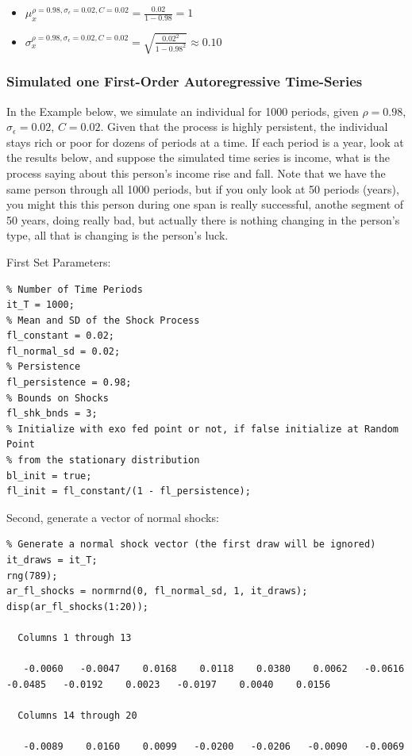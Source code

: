 \documentclass[
]{book}
\begin{document}
\begin{itemize}
\item
  \(\displaystyle \mu_x^{\rho =0.98,\sigma_{\epsilon } =0.02,C=0.02} =\frac{0.02}{1-0.98}=1\)
\item
  \(\displaystyle \sigma_x^{\rho =0.98,\sigma_{\epsilon } =0.02,C=0.02} =\sqrt{\frac{0.02^2 }{1-0.98^2 }}\approx 0.10\)
\end{itemize}

\hypertarget{simulated-one-first-order-autoregressive-time-series}{%
\subsubsection{Simulated one First-Order Autoregressive Time-Series}\label{simulated-one-first-order-autoregressive-time-series}}

In the Example below, we simulate an individual for 1000 periods, given
\(\rho =0.98\), \(\sigma_{\epsilon } =0.02\), \(C=0.02\). Given that the
process is highly persistent, the individual stays rich or poor for
dozens of periods at a time. If each period is a year, look at the
results below, and suppose the simulated time series is income, what is
the process saying about this person's income rise and fall. Note that
we have the same person through all 1000 periods, but if you only look
at 50 periods (years), you might this this person during one span is
really successful, anothe segment of 50 years, doing really bad, but
actually there is nothing changing in the person's type, all that is
changing is the person's luck.

First Set Parameters:

\begin{verbatim}
% Number of Time Periods
it_T = 1000;
% Mean and SD of the Shock Process
fl_constant = 0.02;
fl_normal_sd = 0.02;
% Persistence
fl_persistence = 0.98;
% Bounds on Shocks
fl_shk_bnds = 3;
% Initialize with exo fed point or not, if false initialize at Random Point
% from the stationary distribution
bl_init = true;
fl_init = fl_constant/(1 - fl_persistence);
\end{verbatim}

Second, generate a vector of normal shocks:

\begin{verbatim}
% Generate a normal shock vector (the first draw will be ignored)
it_draws = it_T;
rng(789);
ar_fl_shocks = normrnd(0, fl_normal_sd, 1, it_draws);
disp(ar_fl_shocks(1:20));

  Columns 1 through 13

   -0.0060   -0.0047    0.0168    0.0118    0.0380    0.0062   -0.0616   -0.0485   -0.0192    0.0023   -0.0197    0.0040    0.0156

  Columns 14 through 20

   -0.0089    0.0160    0.0099   -0.0200   -0.0206   -0.0090   -0.0069
\end{verbatim}
\end{document}
